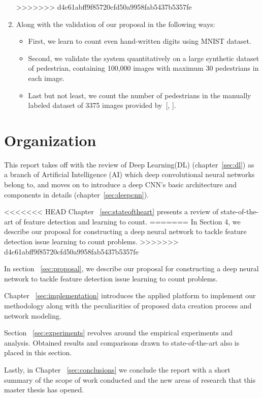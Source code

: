 \begin{enumerate}
>>>>>>> d4c61abff9f85720cfd50a9958fab5437b5357fe
	\item Along with the validation of our proposal in the following ways:
	\begin{itemize}
		\item First, we learn to count even hand-written digits using MNIST dataset. 
		\item Second, we validate the system quantitatively on a large synthetic dataset of pedestrian, containing 100,000 images with maximum 30 pedestrians in each image. 
		\item Last but not least, we count the number of pedestrians in the manually labeled dataset of 3375 images provided by~[\citeauthor*{chan2013ground}, \citeyear{chan2013ground}]. 
	\end{itemize}
	
\end{enumerate}

\section{Organization}

This report takes off with the review of Deep Learning(DL) (chapter~\ref{sec:dl}) as a branch of Artificial Intelligence (AI) which deep convolutional neural networks belong to, and moves on to introduce a deep CNN's basic architecture and components in details (chapter~\ref{sec:deepcnn}). 

<<<<<<< HEAD
Chapter ~\ref{sec:stateoftheart} presents a review of state-of-the-art of feature detection and learning to count. 
=======
In Section 4, we describe our proposal for constructing a deep neural network to tackle feature detection issue learning to count problems. 
>>>>>>> d4c61abff9f85720cfd50a9958fab5437b5357fe

In section ~\ref{sec:proposal}, we describe our proposal for constructing a deep neural network to tackle feature detection issue learning to count problems. 

Chapter ~\ref{sec:implementation} introduces the applied platform to implement our methodology  along with the peculiarities of proposed data creation process and network modeling. 

Section ~\ref{sec:experiments} revolves around the empirical experiments and analysis. Obtained results and comparisons drawn to state-of-the-art also is placed in this section.  

Lastly, in Chapter ~\ref{sec:conclusions} we conclude the report with a short summary of the scope of work conducted and the new areas of research that this master thesis has opened.
